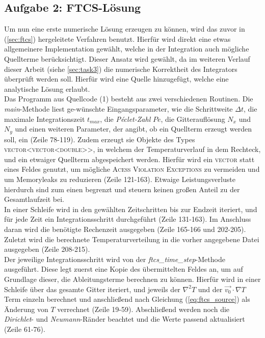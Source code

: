 \documentclass[12pt,a4paper,titlepage,headinclude,bibtotoc]{scrartcl}
\begin{document}
\subsection{Aufgabe 2: FTCS-Lösung}
\label{sec:task2}
Um nun eine erste numerische Lösung erzeugen zu können, wird das zuvor in (\ref{sec:ftcs}) hergeleitete Verfahren benutzt. Hierfür wird direkt eine etwas allgemeinere Implementation gewählt, welche in der Integration auch mögliche Quellterme berücksichtigt. Dieser Ansatz wird gewählt, da im weiteren Verlauf dieser Arbeit (siehe \ref{sec:task3}) die numerische Korrektheit des Integrators überprüft werden soll. Hierfür wird eine Quelle hinzugefügt, welche eine analytische Lösung erlaubt.\\
Das Programm aus Quellcode (1) besteht aus zwei verschiedenen Routinen. Die \textit{main}-Methode liest ge-wünschte Eingangsparameter, wie die Schrittweite $\Delta t$, die maximale Integrationszeit $t_{max}$, die \textit{Péclet-Zahl} $Pe$, die Gitterauflösung $N_x$ und $N_y$ und einen weiteren Parameter, der angibt, ob ein Quellterm erzeugt werden soll, ein (Zeile 78-119). Zudem erzeugt sie Objekte des Types \textsc{vector\textless vector\textless double\textgreater \textgreater}, in welchem der Temperaturverlauf in dem Rechteck, und ein etwaiger Quellterm abgespeichert werden. Hierfür wird ein \textsc{vector} statt eines Feldes genutzt, um mögliche \textsc{Acess Violation Exceptions} zu vermeiden und um Memoryleaks zu reduzieren (Zeile 121-163). Etwaige Leistungsverluste hierdurch sind zum einen begrenzt und steuern keinen großen Anteil zu der Gesamtlaufzeit bei.\\
In einer Schleife wird in den gewählten Zeitschritten bis zur Endzeit iteriert, und für jede Zeit ein Integrationsschritt durchgeführt (Zeile 131-163). Im Anschluss daran wird die benötigte Rechenzeit ausgegeben (Zeile 165-166 und 202-205). Zuletzt wird die berechnete Temperaturverteilung in die vorher angegebene Datei ausgegeben (Zeile 208-215).\\
Der jeweilige Integrationsschritt wird von der \textit{ftcs\_time\_step}-Methode ausgeführt. Diese legt zuerst eine Kopie des übermittelten Feldes an, um auf Grundlage dieser, die Ableitungsterme berechnen zu können. Hierfür wird in einer Schleife über das gesamte Gitter iteriert, und jeweils der $\nabla^2 T$ und der $\vec{v_0} \cdot \nabla T$ Term einzeln berechnet und anschließend nach Gleichung (\ref{eq:ftcs_source}) als Änderung von $T$ verrechnet (Zeile 19-59). Abschließend werden noch die \textit{Dirichlet}- und \textit{Neumann}-Ränder beachtet und die Werte passend aktualisiert (Zeile 61-76). 
\end{document}
